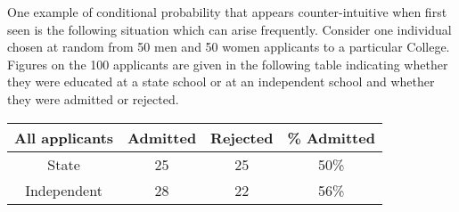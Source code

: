 \begin{example}
One example of conditional probability that appears counter-intuitive when first seen is the following situation which can arise frequently. Consider one individual chosen at random from 50 men and 50 women applicants to a particular College. Figures on the 100 applicants are given in the following table indicating whether they were educated at a state school or at an independent school and whether they were admitted or rejected.
\begin{center}
\begin{tabular}{cccc}
\quad All applicants\quad & \quad Admitted\quad & \quad Rejected \quad &\quad \% Admitted \quad\\
\hline
State & 25 & 25 & 50\% \\
Independent & 28 & 22 & 56\%
\end{tabular}
\end{center}


\end{example}
